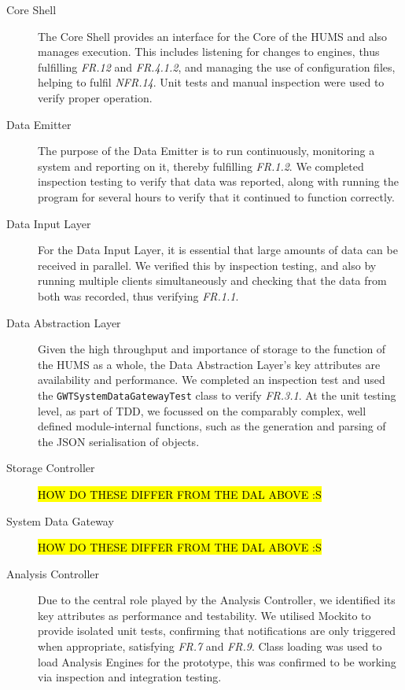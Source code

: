 \documentclass[10pt,a4paper]{article}
\begin{document}
\begin{description}

  \item[Core Shell] The Core Shell provides an interface for the Core of the HUMS and also manages execution. This includes listening for changes to engines, thus fulfilling \emph{FR.12} and \emph{FR.4.1.2}, and managing the use of configuration files, helping to fulfil \emph{NFR.14}. Unit tests and manual inspection were used to verify proper operation.

  \item[Data Emitter] The purpose of the Data Emitter is to run continuously, monitoring a system and reporting on it, thereby fulfilling \emph{FR.1.2}. We completed inspection testing to verify that data was reported, along with running the program for several hours to verify that it continued to function correctly.

  \item[Data Input Layer] For the Data Input Layer, it is essential that large amounts of data can be received in parallel. We verified this by inspection testing, and also by running multiple clients simultaneously and checking that the data from both was recorded, thus verifying \emph{FR.1.1}.

  \item[Data Abstraction Layer] Given the high throughput and importance of storage to the function of the HUMS as a whole, the Data Abstraction Layer's key attributes are availability and performance. We completed an inspection test and used the \texttt{GWTSystemDataGatewayTest} class to verify \emph{FR.3.1}. At the unit testing level, as part of TDD, we focussed on the comparably complex, well defined module-internal functions, such as the generation and parsing of the JSON serialisation of objects.

  \item[Storage Controller] \hl{HOW DO THESE DIFFER FROM THE DAL ABOVE :S}

  \item[System Data Gateway] \hl{HOW DO THESE DIFFER FROM THE DAL ABOVE :S}

  \item[Analysis Controller] Due to the central role played by the Analysis Controller, we identified its key attributes as performance and testability. We utilised Mockito to provide isolated unit tests, confirming that notifications are only triggered when appropriate, satisfying \emph{FR.7} and \emph{FR.9}. Class loading was used to load Analysis Engines for the prototype, this was confirmed to be working via inspection and integration testing.


\end{description}
\end{document}
